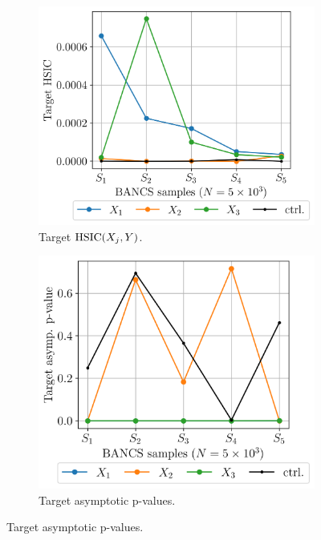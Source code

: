 \begin{figure}
    \centering
    \begin{subfigure}[b]{0.48\linewidth}
        \centering
        \includegraphics[width=\linewidth]{part3/figures/BANCS/ishigami_THSIC.png}
        \caption{Target $\mathrm{HSIC}(X_j, Y)$.}
    \end{subfigure}
    \begin{subfigure}[b]{0.48\linewidth}
        \centering
        \includegraphics[width=\linewidth]{part3/figures/BANCS/ishigami_Tpvalue_asymptotic.png}
        \caption{Target asymptotic p-values.}

\end{subfigure}
\end{figure}
